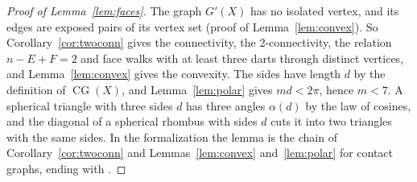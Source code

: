 \documentclass[12pt]{amsart}
\theoremstyle{definition}
\theoremstyle{plain}
\theoremstyle{definition}
\newcommand{\CG}{\operatorname{CG}}
\begin{document}
\begin{proof}[Proof of Lemma~\ref{lem:faces}]
The graph $G'(X)$ has no isolated vertex, and its edges are exposed pairs of its vertex set (proof of Lemma~\ref{lem:convex}). So Corollary~\ref{cor:twoconn} gives the connectivity, the 2-connectivity, the relation $n-E+F=2$ and face walks with at least three darts through distinct vertices, and Lemma~\ref{lem:convex} gives the convexity. The sides have length $d$ by the definition of $\CG(X)$, and Lemma~\ref{lem:polar} gives $md<2\pi$, hence $m<7$. A spherical triangle with three sides $d$ has three angles $\alpha(d)$ by the law of cosines, and the diagonal of a spherical rhombus with sides $d$ cuts it into two triangles with the same sides. In the formalization the lemma is the chain of Corollary~\ref{cor:twoconn} and Lemmas~\ref{lem:convex} and~\ref{lem:polar} for contact graphs, ending with .
\end{proof}
\end{document}
